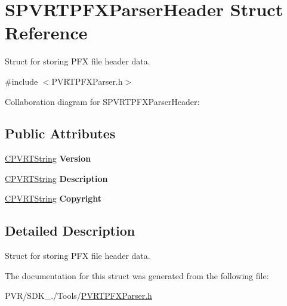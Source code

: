 \hypertarget{struct_s_p_v_r_t_p_f_x_parser_header}{\section{S\+P\+V\+R\+T\+P\+F\+X\+Parser\+Header Struct Reference}
\label{struct_s_p_v_r_t_p_f_x_parser_header}
}


Struct for storing P\+F\+X file header data.  




{\ttfamily \#include $<$P\+V\+R\+T\+P\+F\+X\+Parser.\+h$>$}



Collaboration diagram for S\+P\+V\+R\+T\+P\+F\+X\+Parser\+Header\+:
\subsection*{Public Attributes}
\begin{DoxyCompactItemize}
\item 
\hypertarget{struct_s_p_v_r_t_p_f_x_parser_header_af4290c07bc06b57c2a5128641b64ac2a}{\hyperlink{class_c_p_v_r_t_string}{C\+P\+V\+R\+T\+String} {\bfseries Version}}\label{struct_s_p_v_r_t_p_f_x_parser_header_af4290c07bc06b57c2a5128641b64ac2a}

\item 
\hypertarget{struct_s_p_v_r_t_p_f_x_parser_header_a74d5c23a954f3992d99deddb0895648a}{\hyperlink{class_c_p_v_r_t_string}{C\+P\+V\+R\+T\+String} {\bfseries Description}}\label{struct_s_p_v_r_t_p_f_x_parser_header_a74d5c23a954f3992d99deddb0895648a}

\item 
\hypertarget{struct_s_p_v_r_t_p_f_x_parser_header_a47092f0fcb693530a2dc9d329a723b41}{\hyperlink{class_c_p_v_r_t_string}{C\+P\+V\+R\+T\+String} {\bfseries Copyright}}\label{struct_s_p_v_r_t_p_f_x_parser_header_a47092f0fcb693530a2dc9d329a723b41}

\end{DoxyCompactItemize}


\subsection{Detailed Description}
Struct for storing P\+F\+X file header data. 



 

The documentation for this struct was generated from the following file\+:\begin{DoxyCompactItemize}
\item 
P\+V\+R/\+S\+D\+K\+\_./\+Tools/\hyperlink{_p_v_r_t_p_f_x_parser_8h}{P\+V\+R\+T\+P\+F\+X\+Parser.\+h}\end{DoxyCompactItemize}

